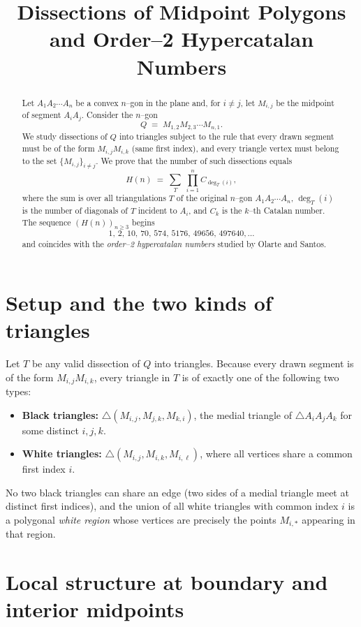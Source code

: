 \documentclass[11pt]{article}
\title{Dissections of Midpoint Polygons and Order--2 Hypercatalan Numbers}
\author{}
\date{}
\begin{document}
\maketitle

\begin{abstract}
Let $A_1A_2\cdots A_n$ be a convex $n$--gon in the plane and, for $i\neq j$, let $M_{i,j}$ be the midpoint of segment $A_iA_j$. Consider the $n$--gon
\[
Q \;=\; M_{1,2}M_{2,3}\cdots M_{n,1}.
\]
We study dissections of $Q$ into triangles subject to the rule that every drawn segment must be of the form $M_{i,j}M_{i,k}$ (same first index), and every triangle vertex must belong to the set $\{M_{i,j}\}_{i\ne j}$. We prove that the number of such dissections equals
\[
H(n) \;=\; \sum_{T} \;\prod_{i=1}^n C_{\deg_T(i)},
\]
where the sum is over all triangulations $T$ of the original $n$--gon $A_1A_2\cdots A_n$, $\deg_T(i)$ is the number of diagonals of $T$ incident to $A_i$, and $C_k$ is the $k$--th Catalan number. The sequence $(H(n))_{n\ge 3}$ begins
\[
1,\,2,\,10,\,70,\,574,\,5176,\,49656,\,497640,\dots
\]
and coincides with the \emph{order--2 hypercatalan numbers} studied by Olarte and Santos.
\end{abstract}

\section{Setup and the two kinds of triangles}

Let $T$ be any valid dissection of $Q$ into triangles. Because every drawn segment is of the form $M_{i,j}M_{i,k}$, every triangle in $T$ is of exactly one of the following two types:
\begin{itemize}[nosep]
  \item \textbf{Black triangles:} $\triangle(M_{i,j},M_{j,k},M_{k,i})$, the medial triangle of $\triangle A_iA_jA_k$ for some distinct $i,j,k$.
  \item \textbf{White triangles:} $\triangle(M_{i,j},M_{i,k},M_{i,\ell})$, where all vertices share a common first index $i$.
\end{itemize}
No two black triangles can share an edge (two sides of a medial triangle meet at distinct first indices), and the union of all white triangles with common index $i$ is a polygonal \emph{white region} whose vertices are precisely the points $M_{i,*}$ appearing in that region.

\section{Local structure at boundary and interior midpoints}
\end{document}
